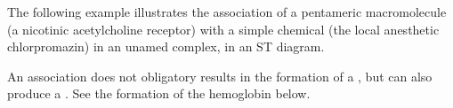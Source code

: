 \begin{center}
\end{center}

The following example illustrates the association of a pentameric macromolecule (a nicotinic acetylcholine receptor) with a simple chemical (the local anesthetic chlorpromazin) in an unamed complex, in an ST diagram. 

\begin{center}
\end{center}

An association does not obligatory results in the formation of a , but can also produce a . See the formation of the hemoglobin below.

\begin{center}
\end{center}
\normalcolor

